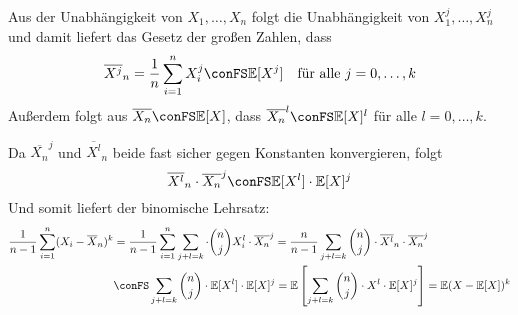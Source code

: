 \begin{loesung}
    Aus der Unabhängigkeit von $X_1,\dots,X_n$ folgt die Unabhängigkeit von $X_1^j,\dots,X_n^j$ und damit 
    liefert das Gesetz der großen Zahlen, dass 
    \[
        \overline{X^j}_n = \dfrac{1}{n}\sum_{i=1}^{n} X_i^j \conFS \E[X^j] \quad \text{für alle }j=0,\dots,k
    \]
    Außerdem folgt aus $\overline{X_n}\conFS \E[X]$, dass $\overline{X_n}^l\conFS \E[X]^l$ für alle $l=0,\dots,k$.

    Da $\overline{X_n}^j$ und $\overline{X^l}_n$ beide fast sicher gegen Konstanten konvergieren, folgt 
    \[
        \overline{X^l}_n\cdot\overline{X_n}^j  \conFS  \E[X^l]\cdot\E[X]^j
    \] 
    Und somit liefert der binomische Lehrsatz:
    \begin{align*}
        \dfrac{1}{n-1}\sum_{i=1}^{n}(X_i-\overline{X}_n)^k 
        &= \dfrac{1}{n-1} \sum_{i=1}^{n} \sum_{j+l=k}\cdot \binom{n}{j} X_i^l\cdot\overline{X_n}^j
        = \dfrac{n}{n-1} \sum_{j+l=k} \binom{n}{j}\cdot \overline{X^l}_n \cdot\overline{X_n}^j \\
        &\conFS \sum_{j+l=k} \binom{n}{j}\cdot \E[X^l]\cdot\E[X]^j 
        = \E\left[\sum_{j+l=k} \binom{n}{j}\cdot X^l\cdot\E[X]^j\right]
        = \E(X-\E[X])^k
    \end{align*}
\end{loesung}

